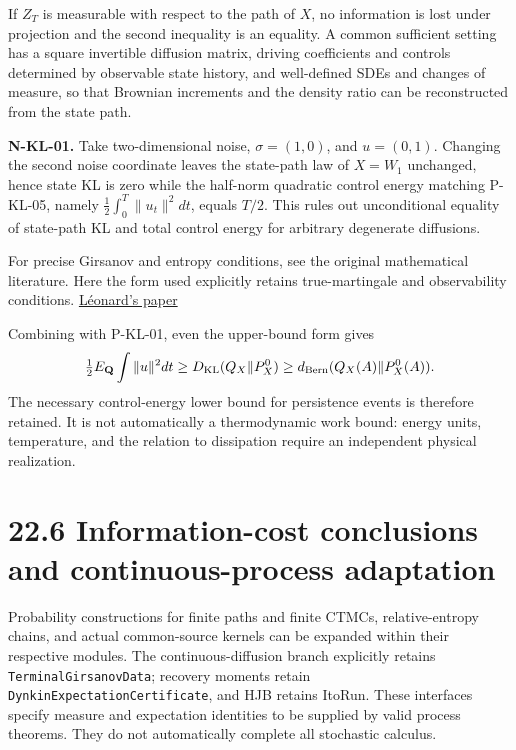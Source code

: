 \documentclass[
  english,
  11pt,
  oneside]{book}
\begin{document}
If \(Z_T\) is measurable with respect to the path of \(X\), no information is lost under projection and the second inequality is an equality. A common sufficient setting has a square invertible diffusion matrix, driving coefficients and controls determined by observable state history, and well-defined SDEs and changes of measure, so that Brownian increments and the density ratio can be reconstructed from the state path.

\textbf{N-KL-01.} Take two-dimensional noise, \(\sigma=(1,0)\), and \(u=(0,1)\). Changing the second noise coordinate leaves the state-path law of \(X=W_1\) unchanged, hence state KL is zero while the half-norm quadratic control energy matching P-KL-05, namely \(\tfrac12\int_0^T\|u_t\|^2dt\), equals \(T/2\). This rules out unconditional equality of state-path KL and total control energy for arbitrary degenerate diffusions.

For precise Girsanov and entropy conditions, see the original mathematical literature. Here the form used explicitly retains true-martingale and observability conditions. \href{https://leonard.perso.math.cnrs.fr/papers/2012-Leonard-Girsanov\%20theory\%20under\%20a\%20finite\%20entropy\%20condition.pdf}{Léonard's paper}

Combining with P-KL-01, even the upper-bound form gives \[\tfrac12E_{\mathbf Q}\int\|u\|^2dt
\ge D_{\rm KL}(Q_X\|P_X^0)
\ge d_{\rm Bern}(Q_X(A)\|P_X^0(A)).\] The necessary control-energy lower bound for persistence events is therefore retained. It is not automatically a thermodynamic work bound: energy units, temperature, and the relation to dissipation require an independent physical realization.

\section{22.6 Information-cost conclusions and continuous-process adaptation}\label{information-cost-conclusions-and-continuous-process-adaptation}

Probability constructions for finite paths and finite CTMCs, relative-entropy chains, and actual common-source kernels can be expanded within their respective modules. The continuous-diffusion branch explicitly retains \nolinkurl{TerminalGirsanovData}; recovery moments retain \nolinkurl{DynkinExpectationCertificate}, and HJB retains ItoRun. These interfaces specify measure and expectation identities to be supplied by valid process theorems. They do not automatically complete all stochastic calculus.
\end{document}
